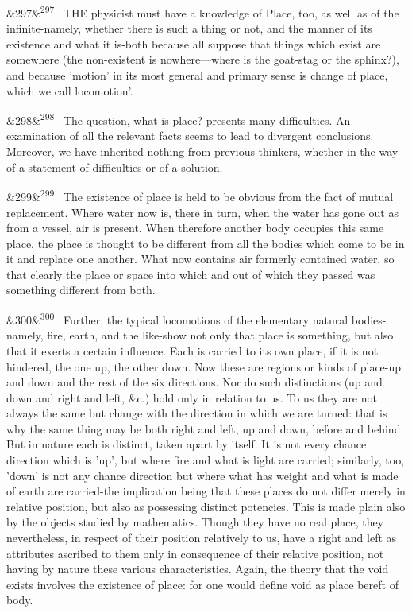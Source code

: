 \documentclass[12pt]{article}
\newcommand{\para}[1][]{\par\noindent\ifx&#1&\else\textsuperscript{\footnotesize #1}~\fi}
\begin{document}
\para[297] THE physicist must have a knowledge of Place, too, as well as of the infinite-namely, whether there is such a thing or not, and the manner of its existence and what it is-both because all suppose that things which exist are somewhere (the non-existent is nowhere---where is the goat-stag or the sphinx?), and because 'motion' in its most general and primary sense is change of place, which we call locomotion’.

\para[298] The question, what is place? presents many difficulties. An examination of all the relevant facts seems to lead to divergent conclusions. Moreover, we have inherited nothing from previous thinkers, whether in the way of a statement of difficulties or of a solution.

\para[299] The existence of place is held to be obvious from the fact of mutual replacement. Where water now is, there in turn, when the water has gone out as from a vessel, air is present. When therefore another body occupies this same place, the place is thought to be different from all the bodies which come to be in it and replace one another. What now contains air formerly contained water, so that clearly the place or space into which and out of which they passed was something different from both.

\para[300] Further, the typical locomotions of the elementary natural bodies-namely, fire, earth, and the like-show not only that place is something, but also that it exerts a certain influence. Each is carried to its own place, if it is not hindered, the one up, the other down. Now these are regions or kinds of place-up and down and the rest of the six directions. Nor do such distinctions (up and down and right and left, \&c.) hold only in relation to us. To us they are not always the same but change with the direction in which we are turned: that is why the same thing may be both right and left, up and down, before and behind. But in nature each is distinct, taken apart by itself. It is not every chance direction which is 'up', but where fire and what is light are carried; similarly, too, 'down' is not any chance direction but where what has weight and what is made of earth are carried-the implication being that these places do not differ merely in relative position, but also as possessing distinct potencies. This is made plain also by the objects studied by mathematics. Though they have no real place, they nevertheless, in respect of their position relatively to us, have a right and left as attributes ascribed to them only in consequence of their relative position, not having by nature these various characteristics. Again, the theory that the void exists involves the existence of place: for one would define void as place bereft of body.
\end{document}
